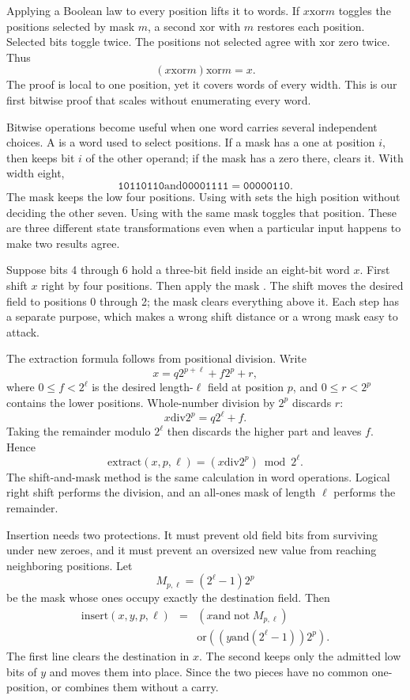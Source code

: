 Applying a Boolean law to every position lifts it to words. If
\(x\mathbin{\mathrm{xor}}m\) toggles the positions selected by mask \(m\), a
second xor with \(m\) restores each position. Selected bits toggle twice.
The positions not selected agree with xor zero twice. Thus
\[
  (x\mathbin{\mathrm{xor}}m)\mathbin{\mathrm{xor}}m=x.
\]
The proof is local to one position, yet it covers words of every width. This
is our first bitwise proof that scales without enumerating every word.

Bitwise operations become useful when one word carries several independent
choices. A  is a word used to select positions. If a mask has a
one at position \(i\), then  keeps bit \(i\) of the other operand;
if the mask has a zero there,  clears it. With width eight,
\[
  \mathtt{10110110}\mathbin{\mathrm{and}}\mathtt{00001111}
  =\mathtt{00000110}.
\]
The mask keeps the low four positions. Using  with
 sets the high position without deciding the other seven.
Using  with the same mask toggles that position. These are three
different state transformations even when a particular input happens to make
two results agree.

\begin{example}[title={Reading a field}]
Suppose bits 4 through 6 hold a three-bit field inside an eight-bit word \(x\).
First shift \(x\) right by four positions. Then apply the mask
. The shift moves the desired field to positions 0 through 2;
the mask clears everything above it. Each step has a separate purpose, which
makes a wrong shift distance or a wrong mask easy to attack.
\end{example}

The extraction formula follows from positional division. Write
\[
  x=q2^{p+\ell}+f2^p+r,
\]
where \(0\leq f<2^\ell\) is the desired length-\(\ell\) field at position
\(p\), and \(0\leq r<2^p\) contains the lower positions. Whole-number
division by \(2^p\) discards \(r\):
\[
  x\mathbin{\mathrm{div}}2^p=q2^\ell+f.
\]
Taking the remainder modulo \(2^\ell\) then discards the higher part and
leaves \(f\). Hence
\[
  \mathrm{extract}(x,p,\ell)=
  (x\mathbin{\mathrm{div}}2^p)\bmod 2^\ell.
\]
The shift-and-mask method is the same calculation in word operations. Logical
right shift performs the division, and an all-ones mask of length \(\ell\)
performs the remainder.

Insertion needs two protections. It must prevent old field bits from surviving
under new zeroes, and it must prevent an oversized new value from reaching
neighboring positions. Let
\[
  M_{p,\ell}=(2^\ell-1)2^p
\]
be the mask whose ones occupy exactly the destination field. Then
\[
\begin{array}{rcl}
  \mathrm{insert}(x,y,p,\ell)&=&
  (x\mathbin{\mathrm{and}}\mathop{\mathrm{not}}M_{p,\ell})\\
  &&\mathbin{\mathrm{or}}
  ((y\mathbin{\mathrm{and}}(2^\ell-1))2^p).
\end{array}
\]
The first line clears the destination in \(x\). The second keeps only the
admitted low bits of \(y\) and moves them into place. Since the two pieces
have no common one-position, or combines them without a carry.

